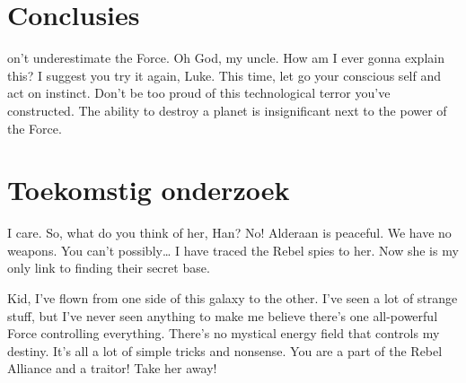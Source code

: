 \documentclass[a0,portrait]{a0poster}
\begin{document}
\begin{multicols}{2}
\color{HoGentAccent1} 
\section*{Conclusies}
\color{black}
on't underestimate the Force. Oh God, my uncle. How am I ever gonna explain this? I suggest you try it again, Luke. This time, let go your conscious self and act on instinct. Don't be too proud of this technological terror you've constructed. The ability to destroy a planet is insignificant next to the power of the Force.
\color{HoGentAccent1} 
\section*{Toekomstig onderzoek}
\color{black}

I care. So, what do you think of her, Han? No! Alderaan is peaceful. We have no weapons. You can't possibly… I have traced the Rebel spies to her. Now she is my only link to finding their secret base.

Kid, I've flown from one side of this galaxy to the other. I've seen a lot of strange stuff, but I've never seen anything to make me believe there's one all-powerful Force controlling everything. There's no mystical energy field that controls my destiny. It's all a lot of simple tricks and nonsense. You are a part of the Rebel Alliance and a traitor! Take her away! 



\end{multicols}
\end{document}
